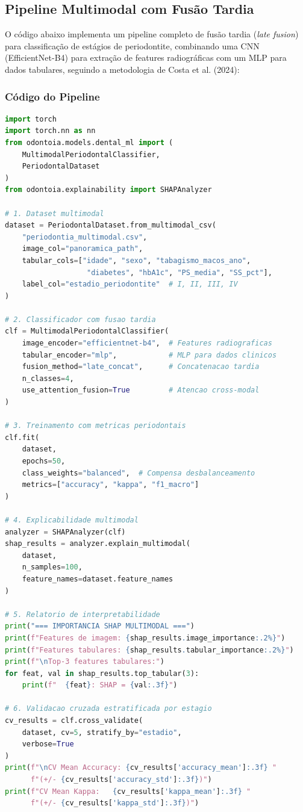 \subsection{Pipeline Multimodal com Fusão Tardia}

O código abaixo implementa um pipeline completo de fusão tardia (\textit{late fusion}) para classificação de estágios de periodontite, combinando uma CNN (EfficientNet-B4) para extração de features radiográficas com um MLP para dados tabulares, seguindo a metodologia de Costa et al. (2024):

\subsubsection{Código do Pipeline}

\begin{lstlisting}[language=Python, caption={Pipeline multimodal para classificação de periodontite com fusão tardia}]
import torch
import torch.nn as nn
from odontoia.models.dental_ml import (
    MultimodalPeriodontalClassifier,
    PeriodontalDataset
)
from odontoia.explainability import SHAPAnalyzer

# 1. Dataset multimodal
dataset = PeriodontalDataset.from_multimodal_csv(
    "periodontia_multimodal.csv",
    image_col="panoramica_path",
    tabular_cols=["idade", "sexo", "tabagismo_macos_ano", 
                   "diabetes", "hbA1c", "PS_media", "SS_pct"],
    label_col="estadio_periodontite"  # I, II, III, IV
)

# 2. Classificador com fusao tardia
clf = MultimodalPeriodontalClassifier(
    image_encoder="efficientnet-b4",  # Features radiograficas
    tabular_encoder="mlp",            # MLP para dados clinicos
    fusion_method="late_concat",      # Concatenacao tardia
    n_classes=4,
    use_attention_fusion=True         # Atencao cross-modal
)

# 3. Treinamento com metricas periodontais
clf.fit(
    dataset,
    epochs=50,
    class_weights="balanced",  # Compensa desbalanceamento
    metrics=["accuracy", "kappa", "f1_macro"]
)

# 4. Explicabilidade multimodal
analyzer = SHAPAnalyzer(clf)
shap_results = analyzer.explain_multimodal(
    dataset,
    n_samples=100,
    feature_names=dataset.feature_names
)

# 5. Relatorio de interpretabilidade
print("=== IMPORTANCIA SHAP MULTIMODAL ===")
print(f"Features de imagem: {shap_results.image_importance:.2%}")
print(f"Features tabulares: {shap_results.tabular_importance:.2%}")
print(f"\nTop-3 features tabulares:")
for feat, val in shap_results.top_tabular(3):
    print(f"  {feat}: SHAP = {val:.3f}")

# 6. Validacao cruzada estratificada por estagio
cv_results = clf.cross_validate(
    dataset, cv=5, stratify_by="estadio",
    verbose=True
)
print(f"\nCV Mean Accuracy: {cv_results['accuracy_mean']:.3f} "
      f"(+/- {cv_results['accuracy_std']:.3f})")
print(f"CV Mean Kappa:   {cv_results['kappa_mean']:.3f} "
      f"(+/- {cv_results['kappa_std']:.3f})")
\end{lstlisting}


